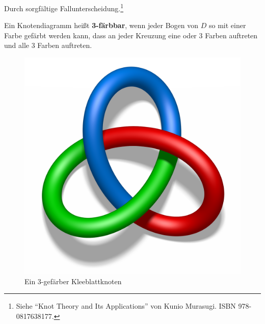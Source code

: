 \begin{beweis}
    Durch sorgfältige Fallunterscheidung.\footnote{Siehe \enquote{Knot Theory and Its Applications} von Kunio Murasugi. ISBN 978-0817638177.}
\end{beweis}

\begin{definition}
    Ein Knotendiagramm heißt \textbf{3-färbbar}, 
    wenn jeder Bogen von $D$ so mit einer Farbe gefärbt werden kann, 
    dass an jeder Kreuzung eine oder 3 Farben auftreten und alle 3 
    Farben auftreten.
\end{definition}

\begin{figure}[htp]
    \centering
    \includegraphics[height=0.3\linewidth, keepaspectratio]{figures/tricoloring.png} 

    \caption{Ein 3-gefärber Kleeblattknoten}
    \label{fig:treefoil-knot-three-colors}
\end{figure}


